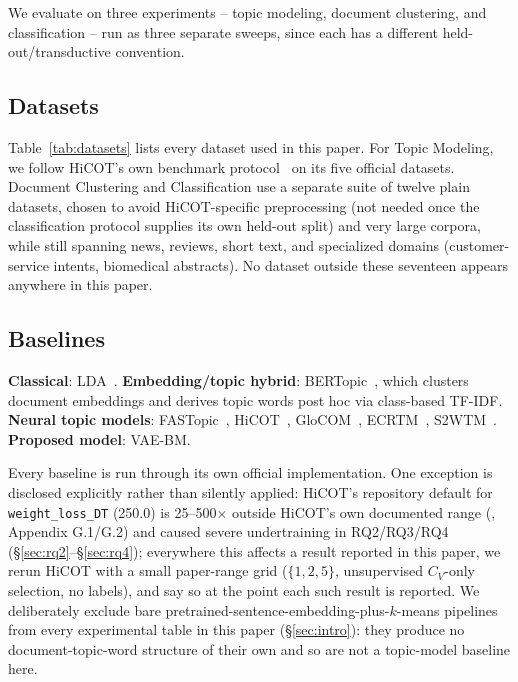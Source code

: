 \documentclass[11pt]{article}
\begin{document}
We evaluate on three experiments -- topic modeling, document clustering, and classification -- run as three separate sweeps, since each has a different held-out/transductive convention.

\subsection{Datasets}
Table~\ref{tab:datasets} lists every dataset used in this paper. For Topic Modeling, we follow HiCOT's own benchmark protocol~\citep{hicot2025} on its five official datasets. Document Clustering and Classification use a separate suite of twelve plain datasets, chosen to avoid HiCOT-specific preprocessing (not needed once the classification protocol supplies its own held-out split) and very large corpora, while still spanning news, reviews, short text, and specialized domains (customer-service intents, biomedical abstracts). No dataset outside these seventeen appears anywhere in this paper.



\subsection{Baselines}
\label{sec:baselines}
\textbf{Classical}: LDA~\citep{blei2003lda}. \textbf{Embedding/topic hybrid}: BERTopic~\citep{grootendorst2022bertopic}, which clusters document embeddings and derives topic words post hoc via class-based TF-IDF. \textbf{Neural topic models}: FASTopic~\citep{wu2024fastopic}, HiCOT~\citep{hicot2025}, GloCOM~\citep{nguyen2025glocom}, ECRTM~\citep{wu2023ecrtm}, S2WTM~\citep{adhya2025s2wtm}. \textbf{Proposed model}: VAE-BM.

Every baseline is run through its own official implementation. One exception is disclosed explicitly rather than silently applied: HiCOT's repository default for \texttt{weight\_loss\_DT} (250.0) is 25--500$\times$ outside HiCOT's own documented range (\citealp{hicot2025}, Appendix G.1/G.2) and caused severe undertraining in RQ2/RQ3/RQ4 (\S\ref{sec:rq2}--\S\ref{sec:rq4}); everywhere this affects a result reported in this paper, we rerun HiCOT with a small paper-range grid ($\{1,2,5\}$, unsupervised $C_V$-only selection, no labels), and say so at the point each such result is reported. We deliberately exclude bare pretrained-sentence-embedding-plus-$k$-means pipelines from every experimental table in this paper (\S\ref{sec:intro}): they produce no document-topic-word structure of their own and so are not a topic-model baseline here.
\end{document}
